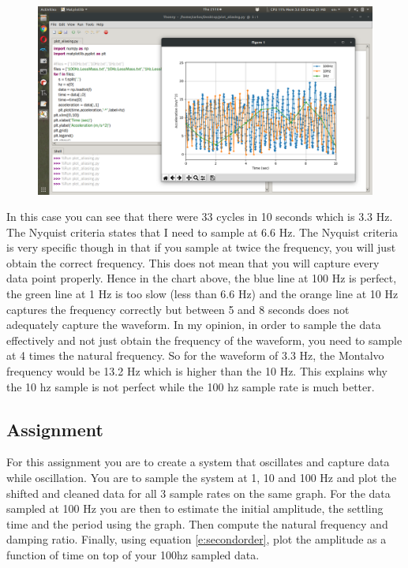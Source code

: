 \begin{figure}[H]
  \begin{center}
    \includegraphics[width=\textwidth]{Figures/aliasing2.png}
  \end{center}
\end{figure}
In this case you can see that there were 33 cycles in 10 seconds which is 3.3 Hz. The Nyquist criteria states that I need to sample at 6.6 Hz. The Nyquist criteria is very specific though in that if you sample at twice the frequency, you will just obtain the correct frequency. This does not mean that you will capture every data point properly. Hence in the chart above, the blue line at 100 Hz is perfect, the green line at 1 Hz is too slow (less than 6.6 Hz) and the orange line at 10 Hz captures the frequency correctly but between 5 and 8 seconds does not adequately capture the waveform. In my opinion, in order to sample the data effectively and not just obtain the frequency of the waveform, you need to sample at 4 times the natural frequency. So for the waveform of 3.3 Hz, the Montalvo frequency would be 13.2 Hz which is higher than the 10 Hz. This explains why the 10 hz sample is not perfect while the 100 hz sample rate is much better. 

\subsection{Assignment}

For this assignment you are to create a system that oscillates and capture data while oscillation. You are to sample the system at 1, 10 and 100 Hz and plot the shifted and cleaned data for all 3 sample rates on the same graph. For the data sampled at 100 Hz you are then to estimate the initial amplitude, the settling time  and the period using the graph. Then compute the natural frequency and damping ratio. Finally, using equation \ref{e:secondorder}, plot the amplitude as a function of time on top of your 100hz sampled data.

